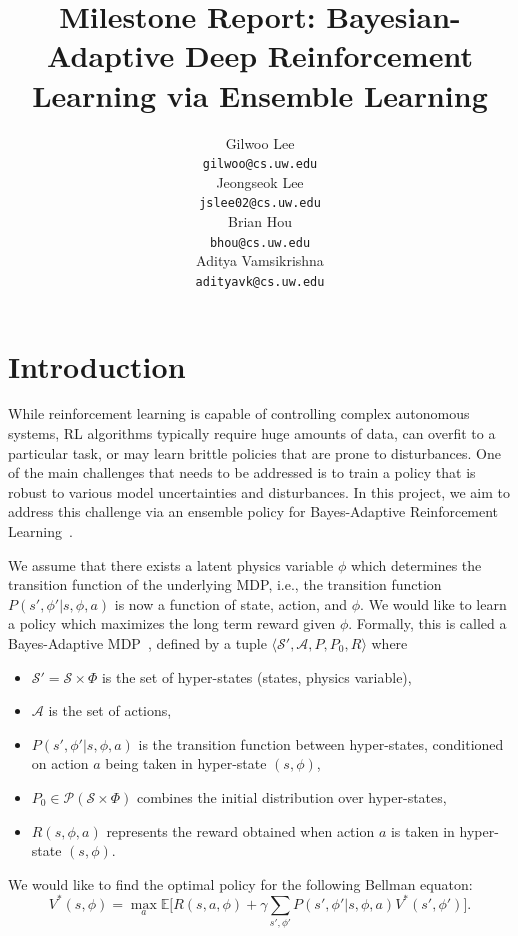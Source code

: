 \documentclass{article}
\title{Milestone Report: Bayesian-Adaptive Deep Reinforcement Learning via Ensemble Learning}
\author{
  Gilwoo Lee \\ \texttt{gilwoo@cs.uw.edu} \\
  \And
  Jeongseok Lee \\ \texttt{jslee02@cs.uw.edu} \\
  \And
  Brian Hou \\ \texttt{bhou@cs.uw.edu} \\
  \And
  Aditya Vamsikrishna \\ \texttt{adityavk@cs.uw.edu} \\
}
\begin{document}

\maketitle

\section{Introduction}
While reinforcement learning is capable of controlling complex autonomous systems, RL algorithms typically require huge amounts of data, can overfit to a particular task, or may learn brittle policies that are prone to disturbances. One of the main challenges that needs to be addressed is to train a policy that is robust to various model uncertainties and disturbances. In this project, we aim to address this challenge via an ensemble policy for Bayes-Adaptive Reinforcement Learning~\cite{ghavamzadeh2015bayesian}.

We assume that there exists a latent physics variable $\phi$ which determines the transition function of the underlying MDP, i.e., the transition function  $P(s',\phi' |s, \phi, a)$ is now a function of state, action, and $\phi$. We would like to learn a policy which maximizes the long term reward given $\phi$. Formally, this is called a Bayes-Adaptive MDP~\cite{ghavamzadeh2015bayesian, ross2008bayes, guez2012efficient}, defined by a tuple $\langle \mathcal{S}', \mathcal{A}, P, P_0, R \rangle$ where
\begin{itemize}
\item $\mathcal{S'} = \mathcal{S}\times \Phi$ is the set of hyper-states (states, physics variable),
\item $\mathcal{A}$ is the set of actions,
\item $P(s',\phi'|s, \phi, a)$ is the transition function between hyper-states, conditioned
on action $a$ being taken in hyper-state $(s, \phi)$,
\item $P_0\in \mathcal{P}(\mathcal{S} \times \Phi)$ combines the initial distribution over hyper-states,
\item $R(s, \phi, a)$ represents the reward obtained when action $a$ is
taken in hyper-state $(s,\phi)$.
\end{itemize}

We would like to find the optimal policy for the following Bellman equaton:
\begin{equation}\label{eq:rl}
V^*(s, \phi) = \max_a \mathbb{E} \bigg[R(s, a, \phi) + \gamma \sum_{s', \phi'}P(s',\phi'|s, \phi, a)V^*(s', \phi') \bigg].
\end{equation}
\end{document}
